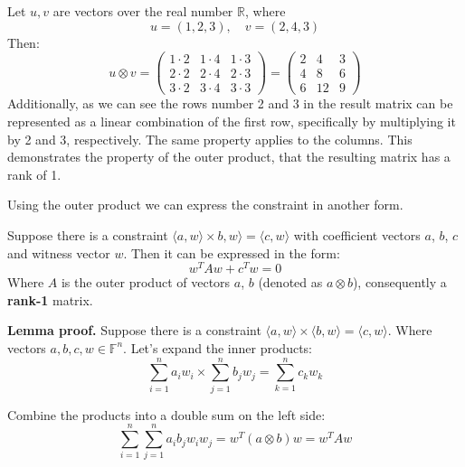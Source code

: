 \documentclass[../lecture-notes.tex]{subfiles}
\begin{document}
\begin{example}
    Let $u, v$ are vectors over the real number $\mathbb{R}$, where
    \begin{equation*}
        u = (1, 2, 3), \quad v = (2, 4, 3)
    \end{equation*}
    Then: 
    \begin{equation*}
        u \otimes v = \begin{pmatrix}
            1 \cdot 2 & 1 \cdot 4 & 1 \cdot 3 \\
            2 \cdot 2 & 2 \cdot 4 & 2 \cdot 3 \\
            3 \cdot 2 & 3 \cdot 4 & 3 \cdot 3
        \end{pmatrix} = \begin{pmatrix}
            2 & 4 & 3 \\
            4 & 8 & 6 \\
            6 & 12 & 9
        \end{pmatrix}
    \end{equation*}
    Additionally, as we can see the rows number 2 and 3 in the result matrix can be represented
    as a linear combination of the first row, specifically by multiplying it by 2 and 3, 
    respectively. The same property applies to the columns. This demonstrates the property of the
    outer product, that the resulting matrix has a rank of 1.
\end{example}

Using the outer product we can express the constraint in another form.

\begin{lemma}
    Suppose there is a constraint $\langle a, w\rangle \times b, w\rangle = \langle c, w \rangle$ 
    with coefficient vectors $a$, $b$, $c$ and witness vector $w$. Then it can be expressed in the 
    form:
    \[ w^T A w + c^T w = 0 \]
    Where $A$ is the outer product of vectors $a$, $b$ (denoted as $a \otimes b$), consequently 
    a \textbf{rank-1} matrix.
\end{lemma}

\textbf{Lemma proof.} Suppose there is a constraint $\langle a, w\rangle \times \langle b, w\rangle
= \langle c, w\rangle$. Where vectors $a, b, c, w \in \mathbb{F}^n $. Let's expand the inner
products: 
\[ \sum_{i=1}^{n} a_i w_i \times \sum_{j=1}^{n} b_j w_j = \sum_{k=1}^{n} c_k w_k \]

Combine the products into a double sum on the left side:
\[ \sum_{i=1}^{n} \sum_{j=1}^{n} a_i b_j w_i w_j = w^T (a \otimes b) w = w^T A w \]
\end{document}
